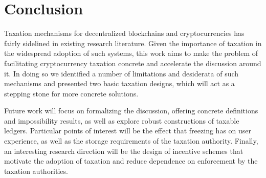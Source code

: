 \section{Conclusion}\label{sec:conclusion}

Taxation mechanisms for decentralized blockchains and cryptocurrencies has
fairly sidelined in existing research literature. Given the importance of
taxation in the widespread adoption of such systems, this work aims to make the
problem of facilitating cryptocurrency taxation concrete and accelerate the
discussion around it. In doing so we identified a number of limitations and
desiderata of such mechanisms and presented two basic taxation designs, which
will act as a stepping stone for more concrete solutions.

Future work will focus on formalizing the discussion, offering concrete
definitions and impossibility results, as well as explore robust constructions
of taxable ledgers. Particular points of interest will be the effect that
freezing has on user experience, as well as the storage requirements of the
taxation authority. Finally, an interesting research direction will be the
design of incentive schemes that motivate the adoption of taxation and reduce
dependence on enforcement by the taxation authorities.

